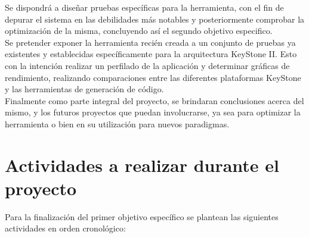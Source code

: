 Se dispondrá a diseñar pruebas específicas para la herramienta, con el fin de 
depurar el sistema en las debilidades más notables y posteriormente comprobar la optimización de la
misma, concluyendo así el segundo objetivo especifico.\\

Se pretender exponer la herramienta recién creada a un conjunto de pruebas
ya existentes y establecidas específicamente para la arquitectura KeyStone II. 
Esto con la intención realizar un perfilado de la aplicación y determinar gráficas de rendimiento, 
realizando comparaciones entre las diferentes plataformas KeyStone y las
herramientas de generación de código.\\

Finalmente como parte integral del proyecto, se brindaran conclusiones acerca
del mismo, y los futuros proyectos que puedan involucrarse, ya sea para
optimizar la herramienta o bien en su utilización para nuevos paradigmas.

\section{Actividades a realizar durante el proyecto}

Para la finalización del primer objetivo específico se plantean las siguientes actividades
en orden cronológico:

